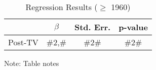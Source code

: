\noindent 
\begin{table}[H]
\caption{Regression Results ($\geq$ 1960)\label{tab:regression_ge_1960}}
\medskip{}

\begin{centering}
\begin{tabular}{cccc}
\hline 
 & $\beta$ & Std. Err. & p-value\tabularnewline
\hline 
Post-TV & \#2,\# & \#2\# & \#2\#\tabularnewline
\hline 
\end{tabular}
\par\end{centering}
\begin{centering}
\medskip{}
\par\end{centering}
{\footnotesize{}Note: Table notes}{\footnotesize\par}
\end{table}